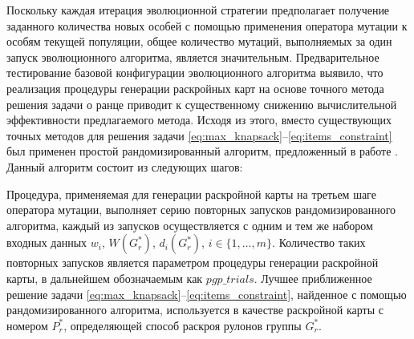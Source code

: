 \documentclass[12pt]{article}
\begin{document}
Поскольку каждая итерация эволюционной стратегии предполагает получение 
заданного количества новых особей с помощью применения оператора мутации к 
особям текущей популяции, общее количество мутаций, выполняемых за один запуск 
эволюционного алгоритма, является значительным. Предварительное тестирование 
базовой конфигурации эволюционного алгоритма выявило, что реализация процедуры 
генерации раскройных карт на основе точного метода решения задачи о ранце 
приводит к существенному снижению вычислительной эффективности предлагаемого 
метода. Исходя из этого, вместо существующих точных методов для решения задачи 
\eqref{eq:max_knapsack}--\eqref{eq:items_constraint} 
был применен простой рандомизированный алгоритм, предложенный в 
работе 
\cite{vahrenkamp96}. 
Данный алгоритм состоит из следующих шагов:

Процедура, применяемая для генерации раскройной карты на третьем шаге 
оператора мутации, выполняет серию повторных запусков рандомизированного 
алгоритма, каждый из запусков осуществляется с одним и тем же набором входных 
данных $w_i$, $W(G_r^*)$, $d_i(G_r^*)$, $i \in \{1,\ldots,m\}$. Количество 
таких повторных запусков является параметром процедуры генерации раскройной 
карты, в дальнейшем обозначаемым как $pgp\_trials$. Лучшее приближенное решение 
задачи 
\eqref{eq:max_knapsack}--\eqref{eq:items_constraint}, 
найденное с помощью рандомизированного алгоритма, 
используется в качестве раскройной карты с номером $P_r^*$, определяющей 
способ раскроя рулонов группы $G_r^*$.
\end{document}
